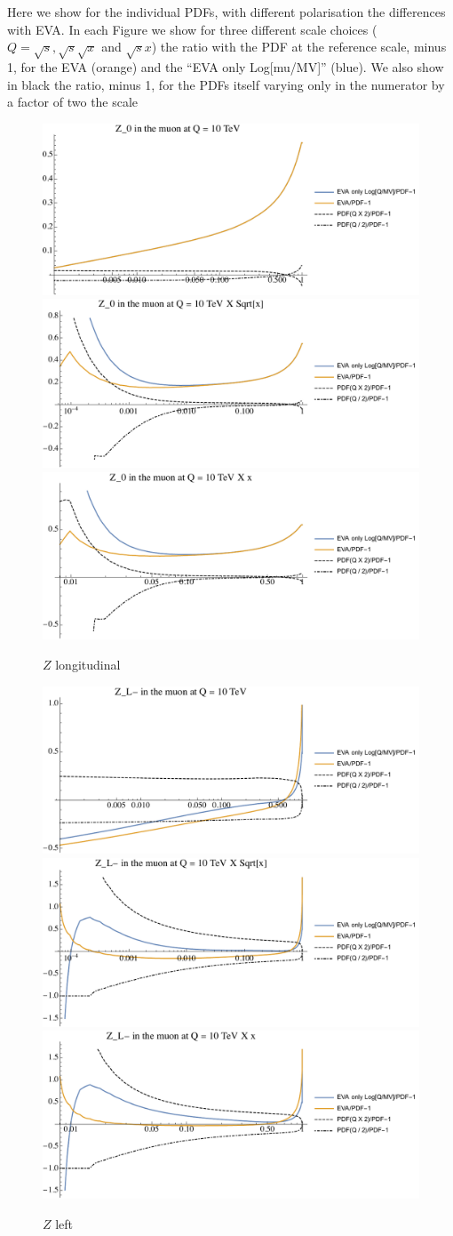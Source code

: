 \documentclass[a4paper,11pt]{article}
\begin{document}
Here we show for the individual PDFs, with different polarisation the differences with EVA. In each Figure we show for three different scale choices ($Q=\sqrt{s}, \sqrt{s} \sqrt{x}$ and $\sqrt{s} x$) the ratio with the PDF at the reference scale, minus 1, for the EVA (orange) and the ``EVA only Log[mu/MV]'' (blue). We also show in black the ratio, minus 1, for the PDFs itself varying only in the numerator by a factor of two the scale



\begin{figure}[!b]
\includegraphics[width=0.46\linewidth]{Notebooks/PlotPDFs/ratios/10TeV/Z_0_Q.pdf}
\includegraphics[width=0.46\linewidth]{Notebooks/PlotPDFs/ratios/10TeV/Z_0_Qsqrtx.pdf}
\includegraphics[width=0.46\linewidth]{Notebooks/PlotPDFs/ratios/10TeV/Z_0_Qx.pdf}
\caption{$Z$ longitudinal}
\end{figure}

\begin{figure}[!b]
\includegraphics[width=0.46\linewidth]{Notebooks/PlotPDFs/ratios/10TeV/Z_L-_Q.pdf}
\includegraphics[width=0.46\linewidth]{Notebooks/PlotPDFs/ratios/10TeV/Z_L-_Qsqrtx.pdf}
\includegraphics[width=0.46\linewidth]{Notebooks/PlotPDFs/ratios/10TeV/Z_L-_Qx.pdf}
\caption{$Z$ left}
\end{figure}
\end{document}
